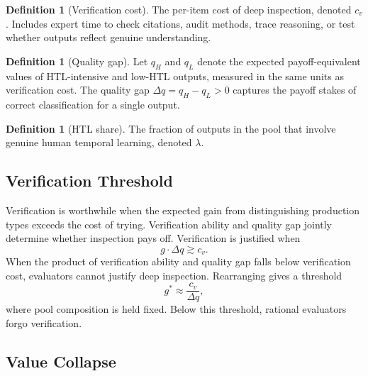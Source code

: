 \documentclass{article}
\theoremstyle{plain}
\theoremstyle{definition}
\newtheorem{definition}[theorem]{Definition}
\theoremstyle{remark}
\begin{document}
\begin{definition}[Verification cost]
\label{def:cv}
The per-item cost of deep inspection, denoted $c_v$. Includes expert time to check citations, audit methods, trace reasoning, or test whether outputs reflect genuine understanding.
\end{definition}

\begin{definition}[Quality gap]
\label{def:dq}
Let $q_H$ and $q_L$ denote the expected payoff-equivalent values of HTL-intensive and low-HTL outputs, measured in the same units as verification cost. The quality gap $\Delta q = q_H - q_L > 0$ captures the payoff stakes of correct classification for a single output.
\end{definition}

\begin{definition}[HTL share]
\label{def:lambda}
The fraction of outputs in the pool that involve genuine human temporal learning, denoted $\lambda$.
\end{definition}

\vspace{-1pt}

\subsection{Verification Threshold}
\label{sec:threshold}

\vspace{-1pt}

Verification is worthwhile when the expected gain from distinguishing production types exceeds the cost of trying. Verification ability and quality gap jointly determine whether inspection pays off. Verification is justified when
\begin{equation}
\label{eq:screen}
g \cdot \Delta q \gtrsim c_v.
\end{equation}
When the product of verification ability and quality gap falls below verification cost, evaluators cannot justify deep inspection. Rearranging gives a threshold
\begin{equation}
\label{eq:threshold}
g^{\ast} \approx \frac{c_v}{\Delta q},
\end{equation}
where pool composition is held fixed. Below this threshold, rational evaluators forgo verification.

\vspace{-1pt}

\subsection{Value Collapse}
\label{sec:pooled}
\end{document}
